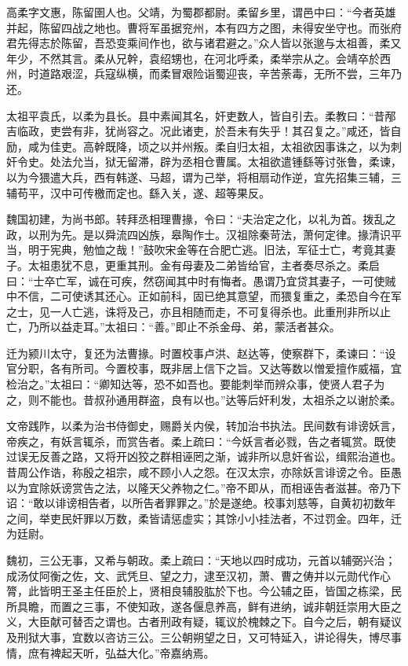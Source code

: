 \documentclass[12pt,UTF8]{ctexbook}
\begin{document}
高柔字文惠，陈留圉人也。父靖，为蜀郡都尉。柔留乡里，谓邑中曰：“今者英雄并起，陈留四战之地也。曹将军虽据兖州，本有四方之图，未得安坐守也。而张府君先得志於陈留，吾恐变乘间作也，欲与诸君避之。”众人皆以张邈与太祖善，柔又年少，不然其言。柔从兄幹，袁绍甥也，在河北呼柔，柔举宗从之。会靖卒於西州，时道路艰涩，兵寇纵横，而柔冒艰险诣蜀迎丧，辛苦荼毒，无所不尝，三年乃还。

太祖平袁氏，以柔为县长。县中素闻其名，奸吏数人，皆自引去。柔教曰：“昔邴吉临政，吏尝有非，犹尚容之。况此诸吏，於吾未有失乎！其召复之。”咸还，皆自励，咸为佳吏。高幹既降，顷之以并州叛。柔自归太祖，太祖欲因事诛之，以为刺奸令史。处法允当，狱无留滞，辟为丞相仓曹属。太祖欲遣锺繇等讨张鲁，柔谏，以为今猥遣大兵，西有韩遂、马超，谓为己举，将相扇动作逆，宜先招集三辅，三辅苟平，汉中可传檄而定也。繇入关，遂、超等果反。

魏国初建，为尚书郎。转拜丞相理曹掾，令曰：“夫治定之化，以礼为首。拨乱之政，以刑为先。是以舜流四凶族，皋陶作士。汉祖除秦苛法，萧何定律。掾清识平当，明于宪典，勉恤之哉！”鼓吹宋金等在合肥亡逃。旧法，军征士亡，考竟其妻子。太祖患犹不息，更重其刑。金有母妻及二弟皆给官，主者奏尽杀之。柔启曰：“士卒亡军，诚在可疾，然窃闻其中时有悔者。愚谓乃宜贷其妻子，一可使贼中不信，二可使诱其还心。正如前科，固已绝其意望，而猥复重之，柔恐自今在军之士，见一人亡逃，诛将及己，亦且相随而走，不可复得杀也。此重刑非所以止亡，乃所以益走耳。”太祖曰：“善。”即止不杀金母、弟，蒙活者甚众。

迁为颍川太守，复还为法曹掾。时置校事卢洪、赵达等，使察群下，柔谏曰：“设官分职，各有所司。今置校事，既非居上信下之旨。又达等数以憎爱擅作威福，宜检治之。”太祖曰：“卿知达等，恐不如吾也。要能刺举而辨众事，使贤人君子为之，则不能也。昔叔孙通用群盗，良有以也。”达等后奸利发，太祖杀之以谢於柔。

文帝践阼，以柔为治书侍御史，赐爵关内侯，转加治书执法。民间数有诽谤妖言，帝疾之，有妖言辄杀，而赏告者。柔上疏曰：“今妖言者必戮，告之者辄赏。既使过误无反善之路，又将开凶狡之群相诬罔之渐，诚非所以息奸省讼，缉熙治道也。昔周公作诰，称殷之祖宗，咸不顾小人之怨。在汉太宗，亦除妖言诽谤之令。臣愚以为宜除妖谤赏告之法，以隆天父养物之仁。”帝不即从，而相诬告者滋甚。帝乃下诏：“敢以诽谤相告者，以所告者罪罪之。”於是遂绝。校事刘慈等，自黄初初数年之间，举吏民奸罪以万数，柔皆请惩虚实；其馀小小挂法者，不过罚金。四年，迁为廷尉。

魏初，三公无事，又希与朝政。柔上疏曰：“天地以四时成功，元首以辅弼兴治；成汤仗阿衡之佐，文、武凭旦、望之力，逮至汉初，萧、曹之俦并以元勋代作心膂，此皆明王圣主任臣於上，贤相良辅股肱於下也。今公辅之臣，皆国之栋梁，民所具瞻，而置之三事，不使知政，遂各偃息养高，鲜有进纳，诚非朝廷崇用大臣之义，大臣献可替否之谓也。古者刑政有疑，辄议於槐棘之下。自今之后，朝有疑议及刑狱大事，宜数以咨访三公。三公朝朔望之日，又可特延入，讲论得失，博尽事情，庶有裨起天听，弘益大化。”帝嘉纳焉。
\end{document}

